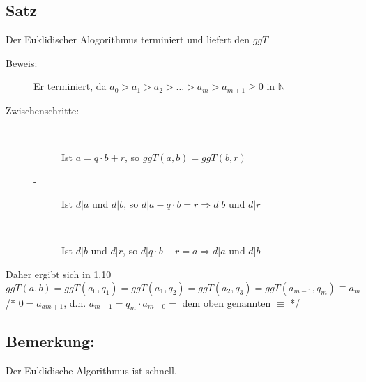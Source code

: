 \subsection{Satz} Der Euklidischer Alogorithmus terminiert und liefert den $ggT$ 
\begin{description}
	\item[Beweis:] Er terminiert, da $a_{0} > a_{1} > a_{2} > \dotsc > a_{m} > a_{m+1} \geq 0$ in $\mathbb{N}$
	\item[Zwischenschritte:] 
	\begin{description}
		\item[-] Ist $a = q \cdot b+r$, so $ggT(a,b) = ggT(b,r)$
		\item[-] Ist $d|a$ und $d|b$, so $d|a-q\cdot b = r \Rightarrow d|b$ und $d|r$
		\item[-] Ist $d|b$ und $d|r$, so $d|q\cdot b + r = a \Rightarrow d|a$ und $d|b$
	\end{description}
\end{description}
Daher ergibt sich in 1.10\\
 $ggT(a,b) = ggT(a_{0}, q_{1}) = ggT(a_{1}, q_{2}) = ggT(a_{2}, q_{3}) = ggT(a_{m-1}, q_{m}) \equiv a_{m}$\\
/* $0 = a_{am+1}$, d.h. $a_{m-1}=q_{m} \cdot a_{m+0} =$ dem oben genannten $\equiv$ */
%
%
%
\subsection{Bemerkung:}
Der Euklidische Algorithmus ist schnell.
%
%
%

